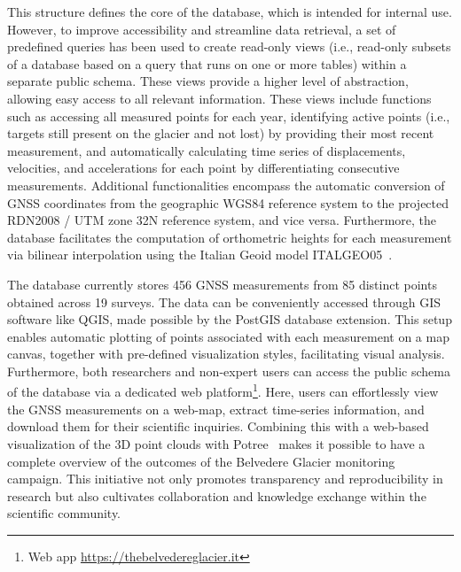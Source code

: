 This structure defines the core of the database, which is intended for internal use. 
However, to improve accessibility and streamline data retrieval, a set of predefined queries has been used to create read-only views (i.e., read-only subsets of a database based on a query that runs on one or more tables) within a separate public schema. 
These views provide a higher level of abstraction, allowing easy access to all relevant information.
These views include functions such as accessing all measured points for each year, identifying active points (i.e., targets still present on the glacier and not lost) by providing their most recent measurement, and automatically calculating time series of displacements, velocities, and accelerations for each point by differentiating consecutive measurements.
Additional functionalities encompass the automatic conversion of GNSS coordinates from the geographic WGS84 reference system to the projected RDN2008 / UTM zone 32N reference system, and vice versa. Furthermore, the database facilitates the computation of orthometric heights for each measurement via bilinear interpolation using the Italian Geoid model ITALGEO05~\citep{Barzaghi2007}.

The database currently stores 456 GNSS measurements from 85 distinct points obtained across 19 surveys. 
The data can be conveniently accessed through GIS software like QGIS, made possible by the PostGIS database extension. 
This setup enables automatic plotting of points associated with each measurement on a map canvas, together with pre-defined visualization styles, facilitating visual analysis.
Furthermore, both researchers and non-expert users can access the public schema of the database via a dedicated web platform\footnote{Web app \url{https://thebelvedereglacier.it}}. Here, users can effortlessly view the GNSS measurements on a web-map, extract time-series information, and download them for their scientific inquiries. 
Combining this with a web-based visualization of the 3D point clouds with Potree~\citep{schutz2016potree} makes it possible to have a complete overview of the outcomes of the Belvedere Glacier monitoring campaign.
This initiative not only promotes transparency and reproducibility in research but also cultivates collaboration and knowledge exchange within the scientific community.

